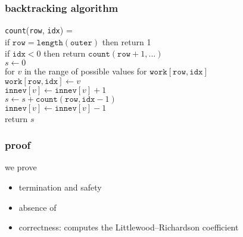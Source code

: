 \documentclass{beamer}
\let\emph\alert
\begin{document}
\begin{frame}\frametitle{backtracking algorithm}
  \begin{flushleft}
    \texttt{count}(\texttt{row}, \texttt{idx}) = \\
    \quad \emph{if} $\texttt{row}=\mathtt{length}(\mathtt{outer})$ \emph{then
    return} 1  \\
    \quad \emph{if} $\mathtt{idx}<0$ \emph{then return}
    $\mathtt{count}(\mathtt{row}+1,...)$  \\
    \quad $s \leftarrow 0$ \\
    \quad \emph{for} $v$ \emph{in} the range of possible values for
    $\mathtt{work}[\mathtt{row},\mathtt{idx}]$ \\
    \quad \quad $\mathtt{work}[\mathtt{row},\mathtt{idx}] \leftarrow
    v$ \\
    \quad \quad $\texttt{innev}[v] \leftarrow \mathtt{innev}[v]+1$ \\
    \quad \quad $s \leftarrow s + \mathtt{count}(\mathtt{row},
    \mathtt{idx}-1)$  \\
    \quad \quad $\texttt{innev}[v] \leftarrow \mathtt{innev}[v]-1$ \\
    \quad \emph{return} $s$
  \end{flushleft}
\end{frame}

\begin{frame}\frametitle{proof}
  we prove
  \begin{itemize}
  \item termination and safety
  \item absence of 
  \item correctness: computes the Littlewood–Richardson coefficient
  \end{itemize}
\end{frame}



\end{document}
